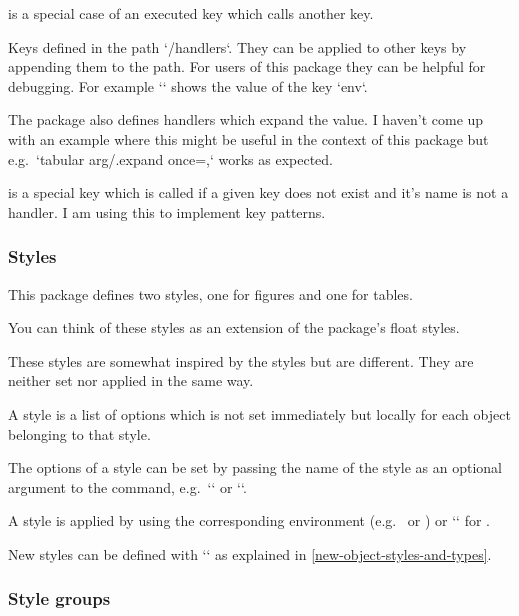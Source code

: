   is a special case of an executed key which calls another key.

  Keys defined in the path `/handlers`.
  They can be applied to other keys by appending them to the path.
  For users of this package they can be helpful for debugging.
  For example `` shows the value of the key `env`.

  The  package also defines handlers which expand the value.
  I haven't come up with an example where this might be useful in the context of this package but e.g.\ `tabular arg/.expand once=\colspec,` works as expected.

  is a special key which is called if a given key does not exist and it's name is not a handler.
  I am using this to implement key patterns.
\endkeytypedoc

\subsubsection{Styles}
\label{styles}

This package defines two styles, one for figures and one for tables.

You can think of these styles as an extension of the  package's float styles.

These styles are somewhat inspired by the  styles but are different.
They are neither set nor applied in the same way.

A style is a list of options which is not set immediately but locally for each object belonging to that style.

The options of a style can be set by passing the name of the style as an optional argument to the \cmd{\objectset} command,
e.g.\ `` or ``.

A style is applied by using the corresponding environment (e.g.\  or )
or `` for .

New styles can be defined with `\NewObjectStyle` as explained in \cref{new-object-styles-and-types}.

\subsubsection{Style groups}
\label{style-groups}

